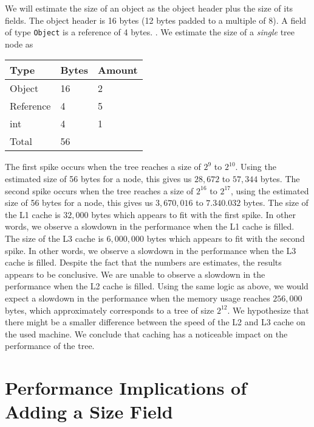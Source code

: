 \documentclass[../main.tex]{subfiles}
\begin{document}
We will estimate the size of an object as the object header plus the size of its fields. The object header is 16 bytes (12 bytes padded to a multiple of 8). A field of type \lstinline{Object} is a reference of 4 bytes. \citep{lindholm-et-al-2020}. We estimate the size of a \emph{single} tree node as
\begin{table}[H]
\begin{tabular}{l|l|l}
Type & Bytes & Amount \\
\hline
Object & 16 & 2 \\
Reference & 4 & 5 \\
int & 4 & 1 \\
\hline
Total & 56 &
\end{tabular}
\end{table}
The first spike occurs when the tree reaches a size of $2^9$ to $2^{10}$. Using the estimated size of 56 bytes for a node, this gives us $28,672$ to $57,344$ bytes. The second spike occurs when the tree reaches a size of $2^{16}$ to $2^{17}$, using the estimated size of 56 bytes for a node, this gives us $3,670,016$ to $7.340.032$ bytes. The size of the L1 cache is $32,000$ bytes which appears to fit with the first spike. In other words, we observe a slowdown in the performance when the L1 cache is filled. The size of the L3 cache is $6,000,000$ bytes which appears to fit with the second spike. In other words, we observe a slowdown in the performance when the L3 cache is filled. Despite the fact that the numbers are estimates, the results appears to be conclusive. We are unable to observe a slowdown in the performance when the L2 cache is filled. Using the same logic as above, we would expect a slowdown in the performance when the memory usage reaches $256,000$ bytes, which approximately corresponds to a tree of size $2^{12}$. We hypothesize that there might be a smaller difference between the speed of the L2 and L3 cache on the used machine. We conclude that caching has a noticeable impact on the performance of the tree.

\section{Performance Implications of Adding a Size Field}
\end{document}
